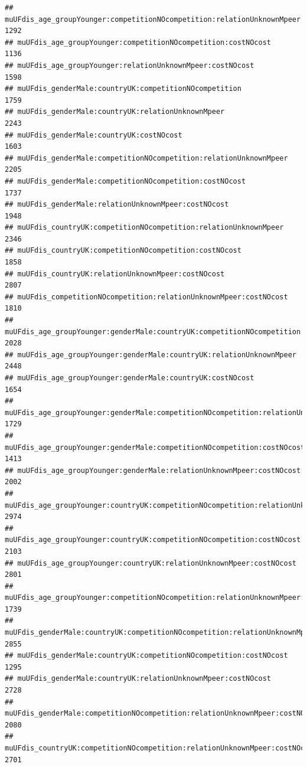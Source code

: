 \documentclass[
]{article}
\begin{document}
\begin{verbatim}
## muUFdis_age_groupYounger:competitionNOcompetition:relationUnknownMpeer                1292
## muUFdis_age_groupYounger:competitionNOcompetition:costNOcost                          1136
## muUFdis_age_groupYounger:relationUnknownMpeer:costNOcost                              1598
## muUFdis_genderMale:countryUK:competitionNOcompetition                                 1759
## muUFdis_genderMale:countryUK:relationUnknownMpeer                                     2243
## muUFdis_genderMale:countryUK:costNOcost                                               1603
## muUFdis_genderMale:competitionNOcompetition:relationUnknownMpeer                      2205
## muUFdis_genderMale:competitionNOcompetition:costNOcost                                1737
## muUFdis_genderMale:relationUnknownMpeer:costNOcost                                    1948
## muUFdis_countryUK:competitionNOcompetition:relationUnknownMpeer                       2346
## muUFdis_countryUK:competitionNOcompetition:costNOcost                                 1858
## muUFdis_countryUK:relationUnknownMpeer:costNOcost                                     2807
## muUFdis_competitionNOcompetition:relationUnknownMpeer:costNOcost                      1810
## muUFdis_age_groupYounger:genderMale:countryUK:competitionNOcompetition                2028
## muUFdis_age_groupYounger:genderMale:countryUK:relationUnknownMpeer                    2448
## muUFdis_age_groupYounger:genderMale:countryUK:costNOcost                              1654
## muUFdis_age_groupYounger:genderMale:competitionNOcompetition:relationUnknownMpeer     1729
## muUFdis_age_groupYounger:genderMale:competitionNOcompetition:costNOcost               1413
## muUFdis_age_groupYounger:genderMale:relationUnknownMpeer:costNOcost                   2002
## muUFdis_age_groupYounger:countryUK:competitionNOcompetition:relationUnknownMpeer      2974
## muUFdis_age_groupYounger:countryUK:competitionNOcompetition:costNOcost                2103
## muUFdis_age_groupYounger:countryUK:relationUnknownMpeer:costNOcost                    2801
## muUFdis_age_groupYounger:competitionNOcompetition:relationUnknownMpeer:costNOcost     1739
## muUFdis_genderMale:countryUK:competitionNOcompetition:relationUnknownMpeer            2855
## muUFdis_genderMale:countryUK:competitionNOcompetition:costNOcost                      1295
## muUFdis_genderMale:countryUK:relationUnknownMpeer:costNOcost                          2728
## muUFdis_genderMale:competitionNOcompetition:relationUnknownMpeer:costNOcost           2080
## muUFdis_countryUK:competitionNOcompetition:relationUnknownMpeer:costNOcost            2701

\end{verbatim}
\end{document}
